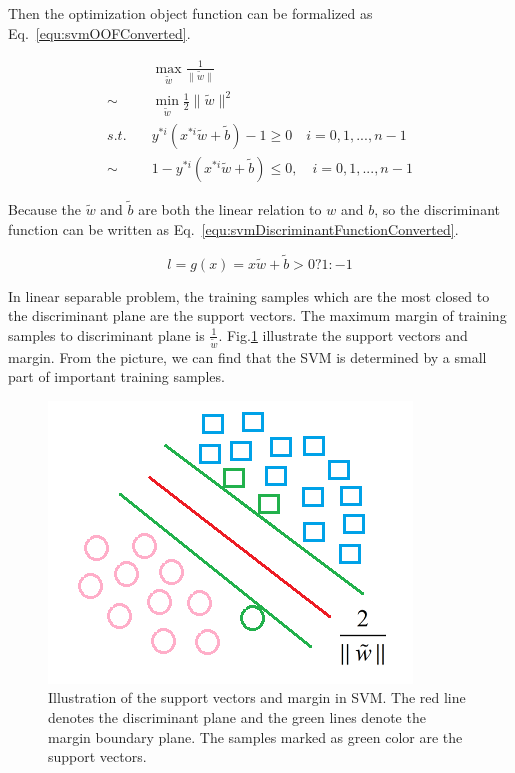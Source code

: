 \documentclass[runningheads,openany]{xhlPaper}
\begin{document}
Then the optimization object function can be formalized as Eq.~\ref{equ:svmOOFConverted}.

\begin{equation}
\label{equ:svmOOFConverted}
\begin{aligned}
&\mathop {\max }\limits_{\tilde w} \frac{1}{{\parallel \tilde w\parallel }}\\
\sim &\mathop {\min }\limits_{\tilde w} \frac{1}{2}\parallel \tilde w{\parallel ^2}\\
s.t.\quad &{y^{*i}}\left( {{x^{*i}}\tilde w + \tilde b} \right) - 1 \ge 0 \quad i = 0,1,...,n - 1\\
\sim &1 - {y^{*i}}\left( {{x^{*i}}\tilde w + \tilde b} \right) \le 0,\quad i = 0,1,...,n - 1
\end{aligned}
\end{equation}

Because the $\tilde w$ and $\tilde b$ are both the linear relation to $w$ and $b$, so the discriminant function can be written as Eq.~\ref{equ:svmDiscriminantFunctionConverted}.

\begin{equation}
\label{equ:svmDiscriminantFunctionConverted}
l = g\left(x \right) = x\tilde w + \tilde b > 0?1: - 1
\end{equation} 

In linear separable problem, the training samples which are the most closed to the discriminant plane are the support vectors. The maximum margin of training samples to discriminant plane is $\frac{1}{\tilde{w}}$. Fig.\ref{fig:svmSupportVector} illustrate the support vectors and margin. From the picture, we can find that the SVM is determined by a small part of important training samples.

\begin{figure}
\centering
\includegraphics[width=0.5\linewidth]{svmSupportVector}
\caption{Illustration of the support vectors and margin in SVM. The red line denotes the discriminant plane and the green lines denote the margin boundary plane. The samples marked as green color are the support vectors.}
\label{fig:svmSupportVector}
\end{figure}
\end{document}
